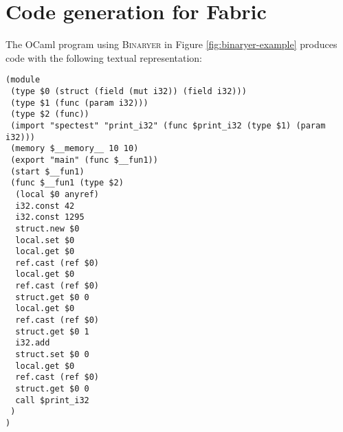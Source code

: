 \chapter{Code generation for Fabric}

The OCaml program using \textsc{Binaryer} in Figure \ref{fig:binaryer-example} produces \wasm{} code with the following textual representation:
\begin{verbatim}    
(module
 (type $0 (struct (field (mut i32)) (field i32)))
 (type $1 (func (param i32)))
 (type $2 (func))
 (import "spectest" "print_i32" (func $print_i32 (type $1) (param i32)))
 (memory $__memory__ 10 10)
 (export "main" (func $__fun1))
 (start $__fun1)
 (func $__fun1 (type $2)
  (local $0 anyref)
  i32.const 42
  i32.const 1295
  struct.new $0
  local.set $0
  local.get $0
  ref.cast (ref $0)
  local.get $0
  ref.cast (ref $0)
  struct.get $0 0
  local.get $0
  ref.cast (ref $0)
  struct.get $0 1
  i32.add
  struct.set $0 0
  local.get $0
  ref.cast (ref $0)
  struct.get $0 0
  call $print_i32
 )
)
\end{verbatim}

